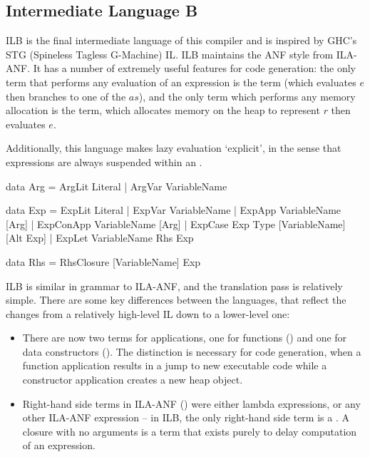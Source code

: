 \documentclass[dissertation.tex]{subfiles}
\begin{document}
{    \subsection{Intermediate Language B}
    {
        ILB is the final intermediate language of this compiler and is inspired by GHC's STG (Spineless Tagless G-Machine) IL. ILB maintains the ANF style from ILA-ANF. It has a number of extremely useful features for code generation: the only term that performs any evaluation of an expression is the  term (which evaluates \(e\) then branches to one of the \(as\)), and the only term which performs any memory allocation is the  term, which allocates memory on the heap to represent \(r\) then evaluates \(e\).

        Additionally, this language makes lazy evaluation `explicit', in the sense that expressions are always suspended within an .

        \begin{haskellfigure}
        data Arg = ArgLit Literal
                 | ArgVar VariableName

        data Exp = ExpLit Literal
                 | ExpVar VariableName
                 | ExpApp VariableName [Arg]
                 | ExpConApp VariableName [Arg]
                 | ExpCase Exp Type [VariableName] [Alt Exp]
                 | ExpLet VariableName Rhs Exp

        data Rhs = RhsClosure [VariableName] Exp
        \end{haskellfigure}

        ILB is similar in grammar to ILA-ANF, and the translation pass is relatively simple. There are some key differences between the languages, that reflect the changes from a relatively high-level IL down to a lower-level one:

        \begin{itemize}
        \item
        {
            There are now two terms for applications, one for functions () and one for data constructors (). The distinction is necessary for code generation, when a function application results in a jump to new executable code while a constructor application creates a new heap object. 
        }
        \item
        {
            Right-hand side terms in ILA-ANF () were either lambda expressions, or any other ILA-ANF expression -- in ILB, the only right-hand side term is a . A closure with no arguments is a term that exists purely to delay computation of an expression.

}
\end{itemize}}}
\end{document}
